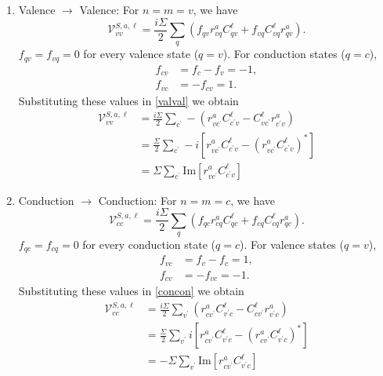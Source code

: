 \documentclass{article}
\begin{document}
\begin{enumerate}
\item Valence $\rightarrow$ Valence:
  For $n = m = v$, we have
  \begin{equation}\label{valval}
    \mathcal{V}^{S,a,\ell}_{vv} = 
    \frac{i\Sigma}{2}\sum_{q}
    \left(f_{qv}r^{a}_{vq}C^{\ell}_{qv} 
        + f_{vq}C^{\ell}_{vq}r^{a}_{qv}\right).
  \end{equation}
  $f_{qv} = f_{vq}= 0$ for every valence state ($q = v$). 
  For conduction states ($q = c$),
  \begin{align*}
      f_{cv} &= f_{c} - f_{v} = -1,\\
      f_{vc} &= -f_{cv} = 1.
  \end{align*}
  Substituting these values in \eqref{valval} we obtain
  \begin{align}
    \mathcal{V}^{S,a,\ell}_{vv} 
    &= \frac{i\Sigma}{2}\sum_{c^{\prime}}
    -\left(r^{a}_{vc^{\prime}}C^{\ell}_{c^{\prime}v} 
         - C^{\ell}_{vc^{\prime}}r^{a}_{c^{\prime}v}\right)\nonumber\\
    &= \frac{\Sigma}{2}\sum_{c^{\prime}}
    -i\left[r^{a}_{vc^{\prime}}C^{\ell}_{c^{\prime}v} 
       - (r^{a}_{vc^{\prime}}C^{\ell}_{c^{\prime}v})^{*}\right]\nonumber\\
    &= \Sigma\sum_{c^{\prime}}
    \text{Im}\left[r^{a}_{vc^{\prime}}C^{\ell}_{c^{\prime}v}\right]
  \end{align}

\item Conduction $\rightarrow$ Conduction:
  For $n = m = c$, we have
  \begin{equation}\label{concon}
    \mathcal{V}^{S,a,\ell}_{cc} = 
    \frac{i\Sigma}{2}\sum_{q}
    \left(f_{qc}r^{a}_{cq}C^{\ell}_{qc}
        + f_{cq}C^{\ell}_{cq}r^{a}_{qc}\right).
  \end{equation}
  $f_{qc} = f_{cq}= 0$ for every conduction state ($q = c$). 
  For valence states ($q = v$),
  \begin{align*}
      f_{vc} &= f_{v} - f_{c} = 1,\\
      f_{cv} &= -f_{vc} = -1.
  \end{align*}
  Substituting these values in \eqref{concon} we obtain
  \begin{align}
    \mathcal{V}^{S,a,\ell}_{cc} 
    &= \frac{i\Sigma}{2}\sum_{v^{\prime}}
    \left(r^{a}_{cv^{\prime}}C^{\ell}_{v^{\prime}c} 
        - C^{\ell}_{cv^{\prime}}r^{a}_{v^{\prime}c}\right)\nonumber\\
    &= \frac{\Sigma}{2}\sum_{v^{\prime}}
    i\left[r^{a}_{cv^{\prime}}C^{\ell}_{v^{\prime}c} 
       - (r^{a}_{cv^{\prime}}C^{\ell}_{v^{\prime}c})^{*}\right]\nonumber\\
    &= -\Sigma\sum_{v^{\prime}}
    \text{Im}\left[r^{a}_{cv^{\prime}}C^{\ell}_{v^{\prime}c}\right]
  \end{align}
\end{enumerate}
\end{document}
